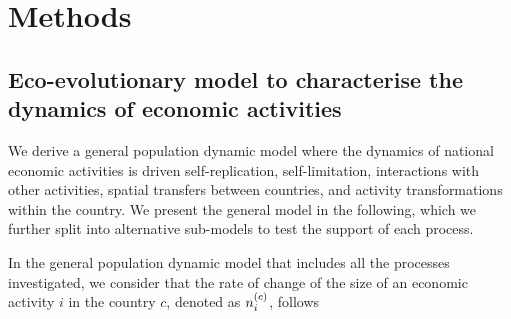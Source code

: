
\section{Methods}\label{sec:methods_econobio}
\subsection{Eco-evolutionary model to characterise the dynamics of economic activities}

We derive a general population dynamic model where the dynamics of national economic activities is driven self-replication, self-limitation, interactions with other activities, spatial transfers between countries, and activity transformations within the country. We present the general model in the following, which we further split into alternative sub-models to test the support of each process.

In the general population dynamic model that includes all the processes investigated, we consider that the rate of change of the size of an economic activity $i$ in the country $c$, denoted as $n_i^{(c)} $, follows

